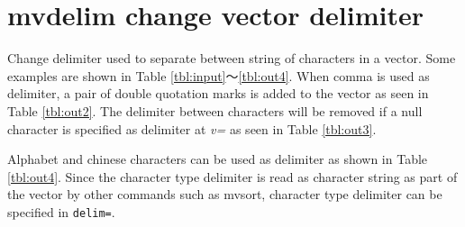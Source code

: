 \documentclass[a4paper]{jarticle}
\begin{document}
\renewcommand{\tablename}{Table }

\setlength{\baselineskip}{4mm}

\section*{mvdelim  change vector delimiter}

Change delimiter used to separate between string of characters in a vector. 
Some examples are shown in Table \ref{tbl:input}〜\ref{tbl:out4}. When comma is used as delimiter, a pair of double quotation marks is added to the vector as seen in Table \ref{tbl:out2}.  The delimiter between characters will be removed if a null character is specified as delimiter at \emph{v=} as seen in Table \ref{tbl:out3}.   

Alphabet and chinese characters can be used as delimiter as shown in Table \ref{tbl:out4}. Since the character type delimiter is read as character string as part of the vector by other commands such as mvsort, character type delimiter can be specified in \verb|delim=|. 
\end{document}
